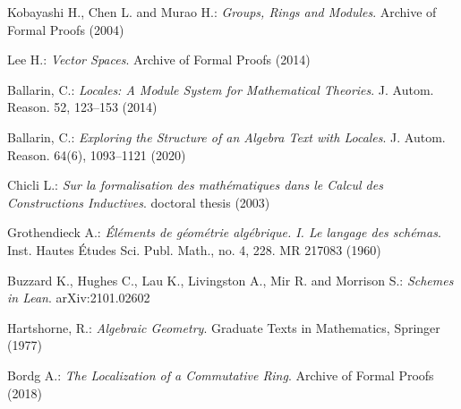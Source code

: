 \documentclass[12pt]{scrartcl}
\begin{document}
\begin{thebibliography}{}
	
	Kobayashi H., Chen L. and Murao H.:
	\newblock \textit{Groups, Rings and Modules}.
	\newblock Archive of Formal Proofs (2004)
	
	Lee H.:
	\newblock \textit{Vector Spaces}.
	\newblock Archive of Formal Proofs (2014)
	
	Ballarin, C.: 
	\newblock \textit{Locales: A Module System for Mathematical Theories}.
	\newblock J. Autom. Reason. 52, 123–153 (2014)
	
	Ballarin, C.:
	\newblock \textit{Exploring the Structure of an Algebra Text with Locales}. 
	\newblock J. Autom. Reason. 64(6), 1093–1121 (2020)
	
	Chicli L.:
	\newblock \textit{Sur la formalisation des math\'ematiques dans le Calcul des Constructions Inductives}.
	\newblock doctoral thesis (2003)
	
	Grothendieck A.:
	\newblock \textit{\'El\'ements de g\'eom\'etrie alg\'ebrique. I. Le langage des sch\'emas}.
	\newblock Inst. Hautes \'Etudes Sci. Publ. Math., no. 4, 228. MR 217083 (1960)
	
	Buzzard K., Hughes C., Lau K., Livingston A., Mir R. and Morrison S.:
	\newblock \textit{Schemes in Lean}.
	\newblock arXiv:2101.02602
	
	Hartshorne, R.:
	\newblock \textit{Algebraic Geometry}.
	\newblock Graduate Texts in Mathematics, Springer (1977)
	
	Bordg A.:
	\newblock \textit{The Localization of a Commutative Ring}.
	\newblock Archive of Formal Proofs (2018)
	
\end{thebibliography}

					

		
\end{document}
